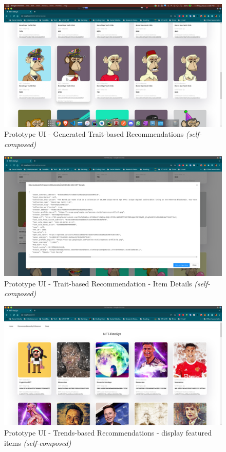 \begin{figure}[h!]
\centering
\includegraphics[width=\textwidth]{images/appendix/Prototype/UI/Prototype UI 2.png}
\caption{Prototype UI - Generated Trait-based Recommendations \textit{(self-composed)}}
\end{figure}

\begin{figure}[h!]
\centering
\includegraphics[width=\textwidth]{images/appendix/Prototype/UI/Prototype UI 3.png}
\caption{Prototype UI - Trait-based Recommendation - Item Details \textit{(self-composed)}}
\end{figure}

\begin{figure}[h!]
\centering
\includegraphics[width=\textwidth]{images/appendix/Prototype/UI/Prototype UI 5.png}
\caption{Prototype UI - Trends-based Recommendations - display featured items \textit{(self-composed)}}
\end{figure}

